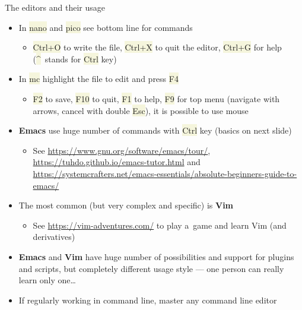 \documentclass[compress, xelatex, 11pt, xcolor=svgnames, aspectratio=169, url={hyphens, lowtilde}]{beamer}
\renewcommand{\texttt}[1]{\colorbox{Beige}{{\ttfamily #1}}}
\begin{document}
\begin{frame}{The editors and their usage}
	\begin{itemize}
		\item In \texttt{nano} and \texttt{pico} see bottom line for commands
		\begin{itemize}
			\item \texttt{Ctrl+O} to write the file, \texttt{Ctrl+X} to quit the editor, \texttt{Ctrl+G} for help (\texttt{\textasciicircum}~stands for \texttt{Ctrl} key)
		\end{itemize}
		\item In \texttt{mc} highlight the file to edit and press \texttt{F4}
		\begin{itemize}
			\item \texttt{F2} to save, \texttt{F10} to quit, \texttt{F1} to help, \texttt{F9} for top menu (navigate with arrows, cancel with double \texttt{Esc}), it is possible to use mouse
		\end{itemize}
		\item \textbf{Emacs} use huge number of commands with \texttt{Ctrl} key (basics on next slide)
		\begin{itemize}
			\item See \url{https://www.gnu.org/software/emacs/tour/}, \url{https://tuhdo.github.io/emacs-tutor.html} and \url{https://systemcrafters.net/emacs-essentials/absolute-beginners-guide-to-emacs/}
		\end{itemize}
		\item The most common (but very complex and specific) is \textbf{Vim}
		\begin{itemize}
			\item See \url{https://vim-adventures.com/} to play a~game and learn Vim (and derivatives)
		\end{itemize}
		\item \textbf{Emacs} and \textbf{Vim} have huge number of possibilities and support for plugins and scripts, but completely different usage style --- one person can really learn only one\ldots
		\item If regularly working in command line, master any command line editor
	\end{itemize}
\end{frame}
\end{document}
